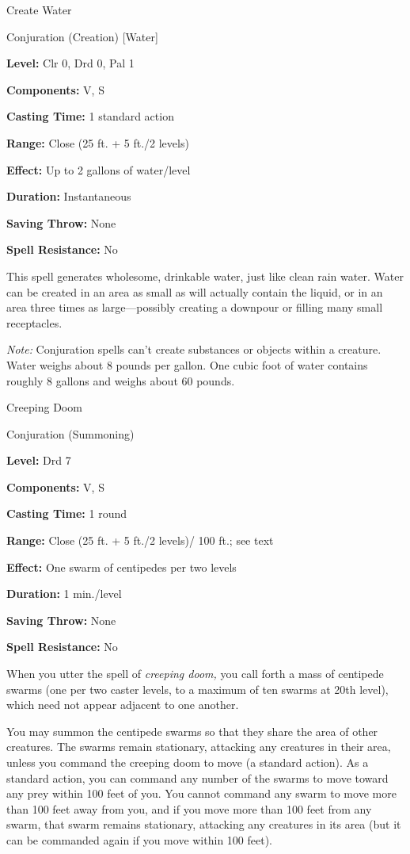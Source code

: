 \documentclass{article}
\begin{document}
\vspace{12pt}
Create Water

Conjuration (Creation) [Water]

\textbf{Level:} Clr 0, Drd 0, Pal 1

\textbf{Components:} V, S

\textbf{Casting Time:} 1 standard action

\textbf{Range:} Close (25 ft. + 5 ft./2 levels)

\textbf{Effect:} Up to 2 gallons of water/level

\textbf{Duration:} Instantaneous

\textbf{Saving Throw:} None

\textbf{Spell Resistance:} No

This spell generates wholesome, drinkable water, just like clean rain water. Water 
can be created in an area as small as will actually contain the liquid, or in an 
area three times as large---possibly creating a downpour or filling many small 
receptacles.

\textit{Note: }Conjuration spells can't create substances or objects within a creature. 
Water weighs about 8 pounds per gallon. One cubic foot of water contains roughly 
8 gallons and weighs about 60 pounds.

\vspace{12pt}
Creeping Doom

Conjuration (Summoning)

\textbf{Level:} Drd 7

\textbf{Components:} V, S

\textbf{Casting Time:} 1 round

\textbf{Range:} Close (25 ft. + 5 ft./2 levels)/ 100 ft.; see text

\textbf{Effect:} One swarm of centipedes per two levels

\textbf{Duration:} 1 min./level

\textbf{Saving Throw:} None

\textbf{Spell Resistance:} No

When you utter the spell of \textit{creeping doom, }you call forth a mass of centipede 
swarms (one per two caster levels, to a maximum of ten swarms at 20th level), which 
need not appear adjacent to one another.

You may summon the centipede swarms so that they share the area of other creatures. 
The swarms remain stationary, attacking any creatures in their area, unless you 
command the creeping doom to move (a standard action). As a standard action, you 
can command any number of the swarms to move toward any prey within 100 feet of 
you. You cannot command any swarm to move more than 100 feet away from you, and 
if you move more than 100 feet from any swarm, that swarm remains stationary, attacking 
any creatures in its area (but it can be commanded again if you move within 100 
feet).
\end{document}
